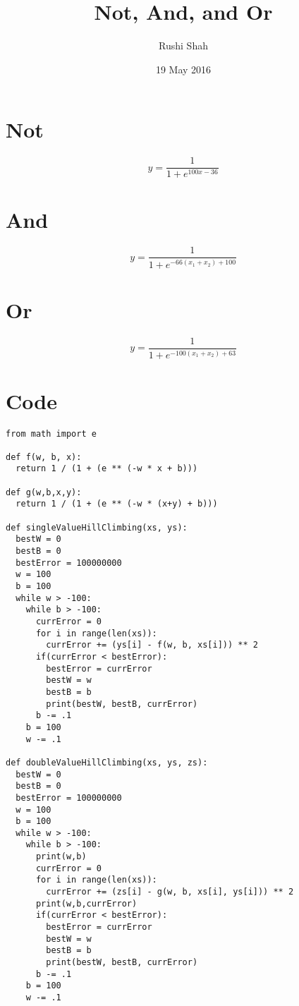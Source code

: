 \documentclass{article}
\author{Rushi Shah}
\date{19 May 2016}
\title{Not, And, and Or}
\begin{document}
\maketitle 

\section{Not}   

\[
y = \frac{1}{1 + e^{100x - 36}}
\]

\section{And}

\[
y = \frac{1}{1 + e^{-66(x_1 + x_2) + 100}}
\]

\section{Or}

\[
y = \frac{1}{1 + e^{-100(x_1 + x_2) + 63}}
\]

\section{Code}

\begin{verbatim}
from math import e

def f(w, b, x):
  return 1 / (1 + (e ** (-w * x + b)))

def g(w,b,x,y):
  return 1 / (1 + (e ** (-w * (x+y) + b)))

def singleValueHillClimbing(xs, ys):
  bestW = 0
  bestB = 0
  bestError = 100000000
  w = 100
  b = 100
  while w > -100:
    while b > -100:
      currError = 0
      for i in range(len(xs)):
        currError += (ys[i] - f(w, b, xs[i])) ** 2
      if(currError < bestError):
        bestError = currError
        bestW = w
        bestB = b
        print(bestW, bestB, currError)
      b -= .1
    b = 100
    w -= .1

def doubleValueHillClimbing(xs, ys, zs):
  bestW = 0
  bestB = 0
  bestError = 100000000
  w = 100
  b = 100
  while w > -100:
    while b > -100:
      print(w,b)
      currError = 0
      for i in range(len(xs)):
        currError += (zs[i] - g(w, b, xs[i], ys[i])) ** 2
      print(w,b,currError)
      if(currError < bestError):
        bestError = currError
        bestW = w
        bestB = b
        print(bestW, bestB, currError)
      b -= .1
    b = 100
    w -= .1
\end{verbatim}
\end{document}
